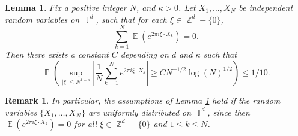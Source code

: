 \documentclass[dvipsnames,letterpaper,12pt]{article}
\numberwithin{equation}{section}
\DeclareMathOperator{\ZZ}{\mathbb{Z}}
\DeclareMathOperator{\TT}{\mathbb{T}}
\newtheorem{lemma}[theorem]{Lemma}
\newtheorem{remark}[theorem]{Remark}
\numberwithin{theorem}{section}
\DeclareMathOperator{\EE}{\mathbb{E}}
\DeclareMathOperator{\PP}{\mathbb{P}}
\begin{document}
\begin{lemma} \label{LemmaGISCICS1}
    Fix a positive integer $N$, and $\kappa > 0$. Let $X_1, \dots, X_N$ be independent random variables on $\TT^d$, such that for each $\xi \in \ZZ^d - \{ 0 \}$,
    \begin{equation} \label{equatioNVVVVSXXJVU1132}
        \sum_{k = 1}^N \EE \left( e^{2 \pi i \xi \cdot X_k} \right) = 0.
    \end{equation}
    Then there exists a constant $C$ depending on $d$ and $\kappa$ such that
    \[ \PP \left( \sup_{|\xi| \leq N^{1 + \kappa}} \left| \frac{1}{N} \sum_{k = 1}^N e^{2 \pi i \xi \cdot X_k} \right| \geq C N^{-1/2} \log(N)^{1/2} \right) \leq 1/10. \]
\end{lemma}

\begin{remark}
    In particular, the assumptions of Lemma \ref{LemmaGISCICS1} hold if the random variables $\{ X_1,\dots, X_N \}$ are uniformly distributed on $\TT^d$, since then $\EE(e^{2 \pi i \xi \cdot X_k}) = 0$ for all $\xi \in \ZZ^d - \{ 0 \}$ and $1 \leq k \leq N$.
\end{remark}
\end{document}
